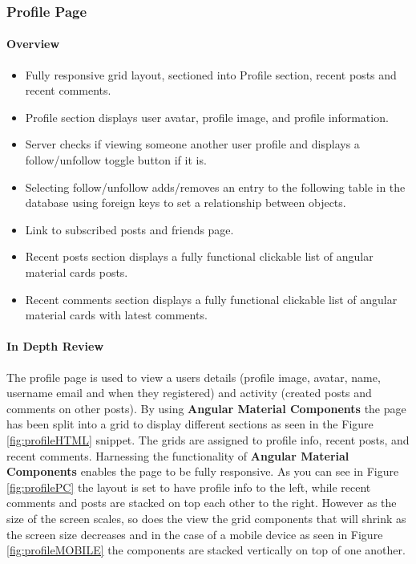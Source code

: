 \subsubsection{Profile Page} 

\paragraph{Overview\newline}
\begin{itemize}
    \item Fully responsive grid layout, sectioned into Profile section, recent posts and recent comments.
    \item Profile section displays user avatar, profile image, and profile information.
    \item Server checks if viewing someone another user profile and displays a follow/unfollow toggle button if it is.
    \item Selecting follow/unfollow adds/removes an entry to the following table in the database using foreign keys to set a relationship between objects. 
    \item Link to subscribed posts and friends page.
    \item Recent posts section displays a fully functional clickable list of angular material cards posts.
    \item Recent comments section displays a fully functional clickable list of angular material cards with latest comments.
\end{itemize}

\paragraph{In Depth Review\newline}
The profile page is used to view a users details (profile image, avatar, name, username email and when they registered) and activity (created posts and comments on other posts). By using \textbf{Angular Material Components} the page has been split into a grid to display different sections as seen in the Figure \ref{fig:profileHTML} snippet. The grids are assigned to profile info, recent posts, and recent comments. Harnessing the functionality of \textbf{Angular Material Components} enables the page to be fully responsive. As you can see in Figure \ref{fig:profilePC} the layout is set to have profile info to the left, while recent comments and posts are stacked on top each other to the right. However as the size of the screen scales, so does the view the grid components that will shrink as the screen size decreases and in the case of a mobile device as seen in Figure \ref{fig:profileMOBILE} the components are stacked vertically on top of one another. 

